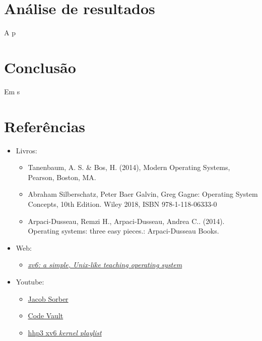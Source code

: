 \documentclass{article}
\begin{document}
\section{Análise de resultados}

A p

\section{Conclusão}

Em s

\section{Referências}

\begin{itemize}
      \item Livros:
            \begin{itemize}
                  \item Tanenbaum, A. S. \& Bos, H. (2014), Modern Operating
                        Systems, Pearson, Boston, MA.
                  \item Abraham Silberschatz, Peter Baer Galvin, Greg Gagne:
                        Operating System Concepts, 10th Edition. Wiley 2018,
                        ISBN
                        978-1-118-06333-0
                  \item Arpaci-Dusseau, Remzi H., Arpaci-Dusseau, Andrea C..
                        (2014).
                        Operating systems: three easy pieces.: Arpaci-Dusseau
                        Books.
            \end{itemize}

      \item Web:
            \begin{itemize}
                  \item

                        \href{https://pdos.csail.mit.edu/6.828/2023/xv6/book-riscv-rev3.pdf}{\textit{xv6:
                                    a
                                    simple, Unix-like teaching operating
                                    system}}
            \end{itemize}

      \item Youtube:
            \begin{itemize}
                  \item \href{https://www.youtube.com/@JacobSorber}{Jacob
                              Sorber}
                  \item \href{https://www.youtube.com/@CodeVault}{Code Vault}
                  \item

                        \href{https://www.youtube.com/watch?v=fWUJKH0RNFE&list=PLbtzT1TYeoMhTPzyTZboW_j7TPAnjv9XB}{hhp3
                              xv6 \textit{kernel playlist}}
            \end{itemize}

\end{itemize}
\end{document}
